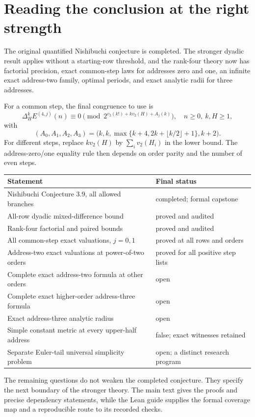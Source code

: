 \clearpage
\section{Reading the conclusion at the right strength}

The original quantified Nishibuchi conjecture is completed. The stronger
dyadic result applies without a starting-row threshold, and the rank-four
theory now has factorial precision, exact common-step laws for addresses zero
and one, an infinite exact address-two family, optimal periods, and exact
analytic radii for three addresses.

For a common step, the final congruence to use is
\[
 \Delta_H^k E^{(4,j)}(n)
 \equiv0\pmod {2^{v_2(k!)+k v_2(H)+A_j(k)}},
 \quad n\ge0,\ k,H\ge1,
\]
with
\[
 (A_0,A_1,A_2,A_3)
 =\bigl(k,k,\max\{k+4,2k+\lfloor k/2\rfloor+1\},k+2\bigr).
\]
For different steps, replace $k v_2(H)$ by $\sum_i v_2(H_i)$ in the lower
bound. The address-zero/one equality rule then depends on order parity and the
number of even steps.

\begin{center}
\begin{tabular}{p{.55\linewidth}p{.35\linewidth}}
\toprule
Statement & Final status \\
\midrule
Nishibuchi Conjecture 3.9, all allowed branches & completed; formal capstone \\
All-row dyadic mixed-difference bound & proved and audited \\
Rank-four factorial and paired bounds & proved and audited \\
All common-step exact valuations, $j=0,1$ & proved at all rows and orders \\
Address-two exact valuations at power-of-two orders & proved for all positive step lists \\
Complete exact address-two formula at other orders & open \\
Complete exact higher-order address-three formula & open \\
Exact address-three analytic radius & open \\
Simple constant metric at every upper-half address & false; exact witnesses retained \\
Separate Euler-tail universal simplicity problem & open; a distinct research program \\
\bottomrule
\end{tabular}
\end{center}

The remaining questions do not weaken the completed conjecture. They specify
the next boundary of the stronger theory. The main text gives the proofs and
precise dependency statements, while the Lean guide supplies the formal
coverage map and a reproducible route to its recorded checks.
